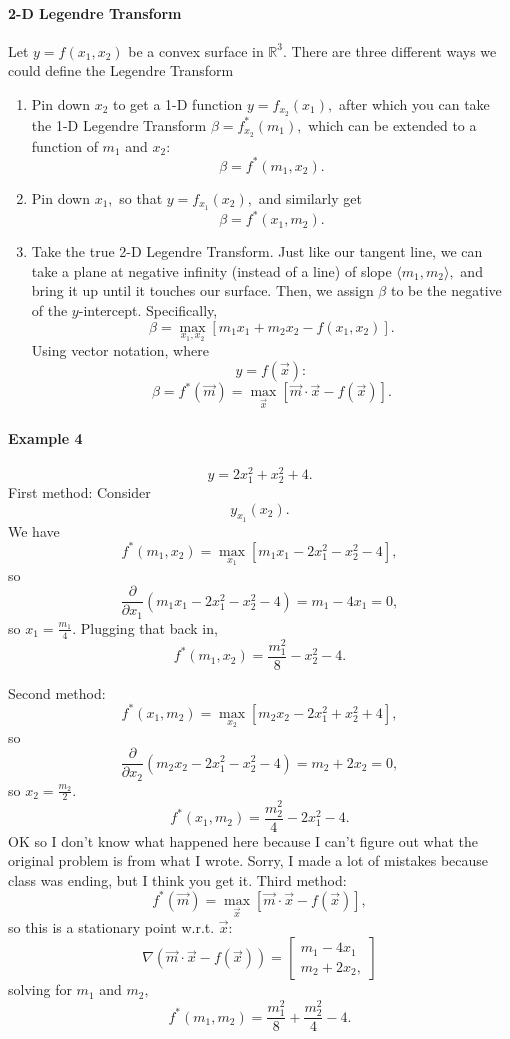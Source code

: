 \documentclass[12pt]{article}
\theoremstyle{remark}
\begin{document}
\paragraph{2-D Legendre Transform}
Let $y=f(x_1,x_2)$ be a convex surface in $\mathbb{R}^3.$  There are three different ways we could define the Legendre Transform
\begin{enumerate}
    \item Pin down $x_2$ to get a 1-D function $y=f_{x_2}(x_1),$ after which you can take the 1-D Legendre Transform $\beta=f_{x_2}^\ast(m_1),$
    which can be extended to a function of $m_1$ and $x_2:$
    \[\beta=f^\ast(m_1,x_2).\]
    \item Pin down $x_1,$ so that $y=f_{x_1}(x_2),$ and similarly get
    \[\beta=f^\ast(x_1,m_2).\]
    \item Take the true 2-D Legendre Transform. Just like our tangent line, we can take a plane at negative infinity (instead of a line) of slope $\langle m_1,m_2\rangle,$ and bring it up until it touches our surface. Then, we assign $\beta$ to be the negative of the $y$-intercept. Specifically,
    \[\beta=\max_{x_1,x_2}[m_1x_1+m_2x_2-f(x_1,x_2)].\] Using vector notation, where
    \[y=f(\vec{x}):\]
    \[\beta=f^\ast(\vec{m})=\max_{\vec{x}}[\vec{m}\cdot\vec{x}-f(\vec{x})].\]
    \end{enumerate}
\paragraph{Example 4}
\[y=2x_1^2+x_2^2+4.\]
First method: Consider
\[y_{x_1}(x_2).\] We have
\[f^\ast(m_1,x_2)=\max_{x_1}[m_1x_1-2x_1^2-x_2^2-4],\]
so
\[\frac{\partial}{\partial x_1}(m_1x_1-2x_1^2-x_2^2-4)=m_1-4x_1=0,\]
so $x_1=\frac{m_1}{4}.$ Plugging that back in,
\[f^\ast(m_1,x_2)=\frac{m_1^2}{8}-x_2^2-4.\]

Second method:
\[f^\ast(x_1,m_2)=\max_{x_2}[m_2x_2-2x_1^2+x_2^2+4],\]
so
\[\frac{\partial}{\partial x_2}(m_2x_2-2x_1^2-x_2^2-4)=m_2+2x_2=0,\]
so $x_2=\frac{m_2}{2}.$
\[f^\ast(x_1,m_2)=\frac{m_2^2}{4}-2x_1^2-4.\]
    OK so I don't know what happened here because I can't figure out what the original problem is from what I wrote. Sorry, I made a lot of mistakes because class was ending, but I think you get it.
Third method:
\[f^\ast(\vec{m})=\max_{\vec{x}}[\vec{m}\cdot\vec{x}-f(\vec{x})],\]
so this is a stationary point w.r.t. $\vec{x}:$
\[\nabla (\vec{m}\cdot\vec{x}-f(\vec{x}))=\begin{bmatrix}
    m_1-4x_1\\
    m_2+2x_2,
\end{bmatrix}\]
solving for $m_1$ and $m_2,$
\[f^\ast(m_1,m_2)=\frac{m_1^2}{8}+\frac{m_2^2}{4}-4.\]
\end{document}
